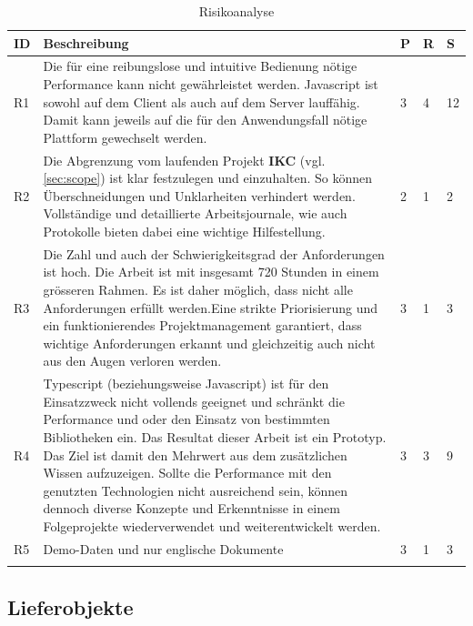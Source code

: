 \begin{longtable}{|p{0.5cm} | p{7cm} | p{1cm}|  p{1cm}|  p{1cm}|}
  \hline
    ID & Beschreibung &  P & R & S \\\hline
    R1 & Die für eine reibungslose und intuitive Bedienung nötige Performance kann nicht gewährleistet werden.\newline\newline
    Javascript ist sowohl auf dem Client als auch auf dem Server lauffähig. Damit kann jeweils auf die für den Anwendungsfall nötige Plattform gewechselt werden. & 3 & 4 & 12\\\hline
    R2 & Die Abgrenzung vom laufenden Projekt \textbf{\acrshort{IKC}} (vgl. \autoref{sec:scope}) ist klar festzulegen und einzuhalten. So können Überschneidungen und Unklarheiten verhindert werden.\newline\newline
    Vollständige und detaillierte Arbeitsjournale, wie auch Protokolle bieten dabei eine wichtige Hilfestellung. & 2 & 1 & 2\\\hline
    R3 & Die Zahl und auch der Schwierigkeitsgrad der Anforderungen ist hoch. Die Arbeit ist mit insgesamt 720 Stunden in einem grösseren Rahmen. Es ist daher möglich, dass nicht alle Anforderungen erfüllt werden.\newline\newline Eine strikte Priorisierung und ein funktionierendes Projektmanagement garantiert, dass wichtige Anforderungen erkannt und gleichzeitig auch nicht aus den Augen verloren werden. & 3 & 1 & 3\\\hline
    R4 & Typescript (beziehungsweise Javascript) ist für den Einsatzzweck nicht vollends geeignet und schränkt die Performance und oder den Einsatz von bestimmten Bibliotheken ein.\newline\newline
    Das Resultat dieser Arbeit ist ein Prototyp. Das Ziel ist damit den Mehrwert aus dem zusätzlichen Wissen aufzuzeigen. Sollte die Performance mit den genutzten Technologien nicht ausreichend sein, können dennoch diverse Konzepte und Erkenntnisse in einem Folgeprojekte wiederverwendet und weiterentwickelt werden.& 3 & 3 & 9\\\hline
    R5 & Demo-Daten und nur englische Dokumente & 3 & 1 & 3\\\hline
    \caption{Risikoanalyse}
  \label{tab:risikoanalyse}
\end{longtable}

\subsection{Lieferobjekte}

